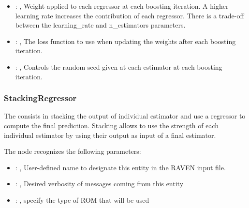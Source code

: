 \begin{itemize}
    \item {}: , 
      Weight applied to each regressor at each boosting iteration.
      A higher learning rate increases the contribution of each regressor.
      There is a trade-off between the learning\_rate and n\_estimators
      parameters.

    \item {}: , 
      The loss function to use when updating the weights after each
      boosting iteration.

    \item {}: , 
      Controls the random seed given at each estimator at each
      boosting iteration.
  \end{itemize}


\subsubsection{StackingRegressor}
  The  consists in stacking the output of individual estimator and
  use a regressor to compute the final prediction. Stacking allows to use the strength of each
  individual estimator by using their output as input of a final estimator.

  The  node recognizes the following parameters:
    \begin{itemize}
      \item {}: , 
        User-defined name to designate this entity in the RAVEN input file.
      \item {}: , 
        Desired verbosity of messages coming from this entity
      \item {}: , 
        specify the type of ROM that will be used
  \end{itemize}

